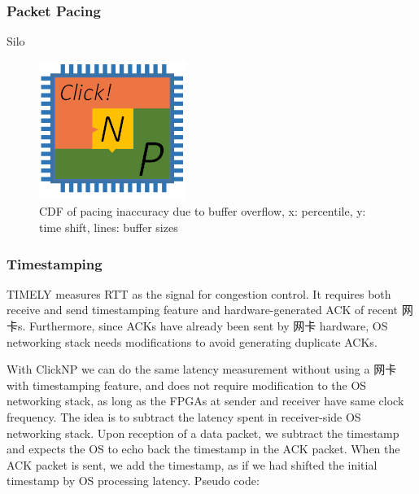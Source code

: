 {\subsubsection{Packet Pacing}

Silo \cite{jang2015silo}

\begin{figure}[h!]
	\centering
	\includegraphics[width=0.6\columnwidth]{image/logo}
	\vspace{-0.15in}
	\caption{CDF of pacing inaccuracy due to buffer overflow, x: percentile, y: time shift, lines: buffer sizes}
	\vspace{-0.15in}
	\label{clicknp:fig:PacingAccuracy}
\end{figure}

\subsubsection{Timestamping}

TIMELY \cite{mittal2015timely} measures RTT as the signal for congestion control. It requires both receive and send timestamping feature and hardware-generated ACK of recent 网卡s. Furthermore, since ACKs have already been sent by 网卡 hardware, OS networking stack needs modifications to avoid generating duplicate ACKs.

With ClickNP we can do the same latency measurement without using a 网卡 with timestamping feature, and does not require modification to the OS networking stack, as long as the FPGAs at sender and receiver have same clock frequency. The idea is to subtract the latency spent in receiver-side OS networking stack. Upon reception of a data packet, we subtract the timestamp and expects the OS to echo back the timestamp in the ACK packet. When the ACK packet is sent, we add the timestamp, as if we had shifted the initial timestamp by OS processing latency. Pseudo code:

}
